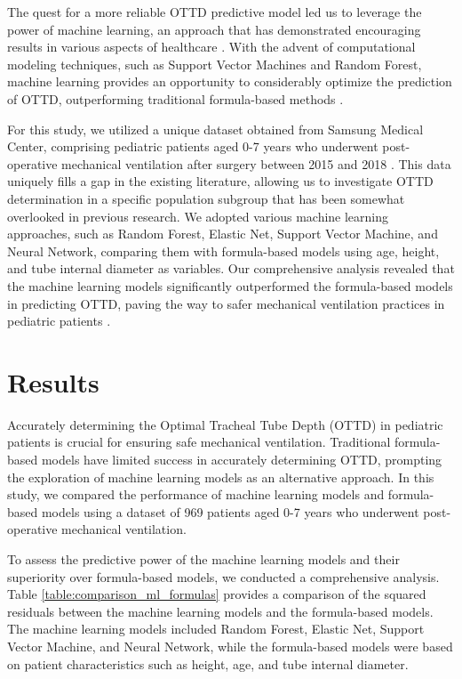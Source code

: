 \documentclass[11pt]{article}
\begin{document}
The quest for a more reliable OTTD predictive model led us to leverage the power of machine learning, an approach that has demonstrated encouraging results in various aspects of healthcare \cite{Khera2021UseOM}. With the advent of computational modeling techniques, such as Support Vector Machines and Random Forest, machine learning provides an opportunity to considerably optimize the prediction of OTTD, outperforming traditional formula-based methods \cite{Fleuren2020MachineLF, Roberts2020CommonPA}.

For this study, we utilized a unique dataset obtained from Samsung Medical Center, comprising pediatric patients aged 0-7 years who underwent post-operative mechanical ventilation after surgery between 2015 and 2018 \cite{Kress2000DailyIO}. This data uniquely fills a gap in the existing literature, allowing us to investigate OTTD determination in a specific population subgroup that has been somewhat overlooked in previous research. We adopted various machine learning approaches, such as Random Forest, Elastic Net, Support Vector Machine, and Neural Network, comparing them with formula-based models using age, height, and tube internal diameter as variables. Our comprehensive analysis revealed that the machine learning models significantly outperformed the formula-based models in predicting OTTD, paving the way to safer mechanical ventilation practices in pediatric patients \cite{Ma2020MachineLI}.

\section*{Results}
Accurately determining the Optimal Tracheal Tube Depth (OTTD) in pediatric patients is crucial for ensuring safe mechanical ventilation. Traditional formula-based models have limited success in accurately determining OTTD, prompting the exploration of machine learning models as an alternative approach. In this study, we compared the performance of machine learning models and formula-based models using a dataset of 969 patients aged 0-7 years who underwent post-operative mechanical ventilation.

To assess the predictive power of the machine learning models and their superiority over formula-based models, we conducted a comprehensive analysis. Table \ref{table:comparison_ml_formulas} provides a comparison of the squared residuals between the machine learning models and the formula-based models. The machine learning models included Random Forest, Elastic Net, Support Vector Machine, and Neural Network, while the formula-based models were based on patient characteristics such as height, age, and tube internal diameter.
\end{document}

